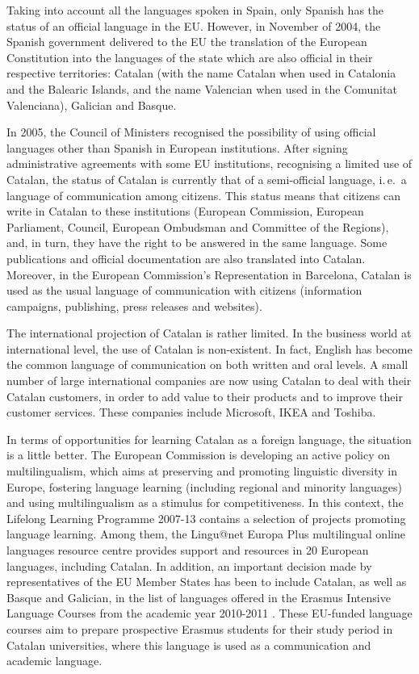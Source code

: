 \begin{multicols}{2}
Taking into account all the languages spoken in Spain, only Spanish has the status of an official language in the EU.  However, in November of 2004, the Spanish government delivered to the EU the translation of the European Constitution into the languages of the state which are also official in their respective territories: Catalan (with the name Catalan when used in Catalonia and the Balearic Islands, and the name Valencian when used in the Comunitat Valenciana), Galician and Basque. 

In 2005, the Council of Ministers recognised the possibility of using official languages other than Spanish in European institutions. After signing administrative agreements with some EU institutions, recognising a limited use of Catalan, the status of Catalan is currently that of a semi-official language, i.\,e.~a language of communication among citizens. This status means that citizens can write in Catalan to these institutions (European Commission, European Parliament, Council, European Ombudsman and Committee of the Regions), and, in turn, they have the right to be answered in the same language. Some publications and official documentation are also translated into Catalan. Moreover, in the European Commission’s Representation in Barcelona, Catalan is used as the usual language of communication with citizens (information campaigns, publishing, press releases and websites).

The international projection of Catalan is rather limited. In the business world at international level, the use of Catalan is non-existent. In fact, English has become the common language of communication on both written and oral levels. A small number of large international companies are now using Catalan to deal with their Catalan customers, in order to add value to their products and to improve their customer services. These companies include Microsoft, IKEA and Toshiba.

In terms of opportunities for learning Catalan as a foreign language, the situation is a little better. The European Commission is developing an active policy on multilingualism, which aims at preserving and promoting linguistic diversity in Europe, fostering language learning (including regional and minority languages) and using multilingualism as a stimulus for competitiveness. In this context, the Lifelong Learning Programme 2007-13 contains a selection of projects promoting language learning. Among them, the Lingu@net Europa Plus multilingual online languages resource centre \cite{CAT-Nota9} provides support and resources in 20 European languages, including Catalan. In addition, an important decision made by representatives of the EU Member States has been to include Catalan, as well as Basque and Galician, in the list of languages offered in the Erasmus Intensive Language Courses from the academic year 2010-2011 \cite{CAT-Nota10}. These EU-funded language courses aim to prepare prospective Erasmus students for their study period in Catalan universities, where this language is used as a communication and academic language.


\end{multicols}
